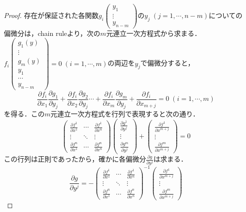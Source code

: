 \documentclass[uplatex, dvipdfmx]{jsreport}
\begin{document}
\begin{proof}
    存在が保証された各関数$g_i\begin{pmatrix}y_1\\\vdots\\y_{n-m}\end{pmatrix}$の$y_j\;(j=1,\cdots,n-m)$についての偏微分は，chain ruleより，次の$m$元連立一次方程式から求まる．
    $f_i\begin{pmatrix}g_1(y)\\\vdots\\g_m(y)\\y_1\\\cdots\\y_{n-m}\end{pmatrix}=0\;(i=1,\cdots,m)$の両辺を$y_j$で偏微分すると，
    \[ \frac{\partial f_i}{\partial x_1}\frac{\partial g_1}{\partial y_j} + \frac{\partial f_i}{\partial x_2}\frac{\partial g_2}{\partial y_j} \cdots +\frac{\partial f_i}{\partial x_m}\frac{\partial g_m}{\partial y_j} + \frac{\partial f_i}{\partial x_{m+j}} = 0 \;(i=1,\cdots,m)\]
    を得る．この$m$元連立一次方程式を行列で表現すると次の通り．
    \[ \begin{pmatrix}\frac{\partial f^1}{\partial x^1}&\cdots&\frac{\partial f^1}{\partial x^n}\\\vdots&\ddots&\vdots\\\frac{\partial f^n}{\partial x^1}&\cdots&\frac{\partial f^n}{\partial x^n}\end{pmatrix}\begin{pmatrix}\frac{\partial g^1}{\partial y^j}\\\vdots\\\frac{\partial g^m}{\partial y^j}\end{pmatrix} + \begin{pmatrix}\frac{\partial f^1}{\partial x^{m+j}}\\\vdots\\\frac{\partial f^m}{\partial x^{m+j}}\end{pmatrix} =0 \]
    この行列は正則であったから，確かに各偏微分$\frac{\partial g}{\partial y^j}$は求まる．
    \[ \frac{\partial g}{\partial y^j} = - \begin{pmatrix}\frac{\partial f^1}{\partial x^1}&\cdots&\frac{\partial f^1}{\partial x^n}\\\vdots&\ddots&\vdots\\\frac{\partial f^n}{\partial x^1}&\cdots&\frac{\partial f^n}{\partial x^n}\end{pmatrix}^{-1}\begin{pmatrix}\frac{\partial f^1}{\partial x^{m+j}}\\\vdots\\\frac{\partial f^m}{\partial x^{m+j}}\end{pmatrix} \]
\end{proof}
\end{document}

